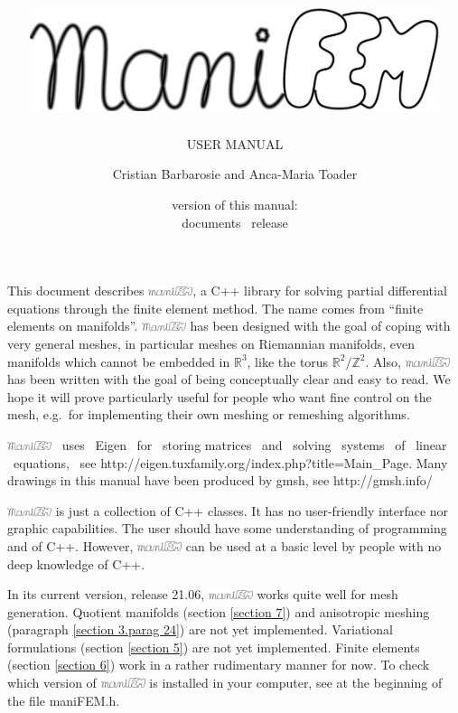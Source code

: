 \documentclass[a4paper]{scrreprt}
\title{\includegraphics[width=12cm]{manifem-grey-capital.eps}}
\subtitle{USER MANUAL}
\author{Cristian Barbarosie and Anca-Maria Toader}
\date{\small version of this manual: \manualversion\\ documents \maniFEM\ release \manifemrelease}
\def\manifemrelease{21.06}
\def\numb{}
\newcommand\ManiFEM{\leavevmode\hbox{\includegraphics[width=13mm]{manifem-large}}}
\newcommand\maniFEM{\leavevmode\hbox{\includegraphics[width=13mm]{manifem-small}}}
\renewcommand\tt{\normalfont\ttfamily}
\begin{document}
\begin{titlepage}
\maketitle
\end{titlepage}


\chapter*{}

This document describes \maniFEM, a {\tt C++} library for solving partial differential equations
through the finite element method.
The name comes from ``finite elements on manifolds''. 
{\ManiFEM} has been designed with the goal of coping with very general meshes,
in particular meshes on Riemannian manifolds, even manifolds which cannot be embedded
in $ {\mathbb R}^3 $, like the torus $ {\mathbb R}^2/{\mathbb Z}^2 $.
Also, {\maniFEM} has been written with the goal of being conceptually clear
and easy to read.
We hope it will prove particularly useful for people who want fine control on the mesh,
e.g.\ for implementing their own meshing or remeshing algorithms.

{\ManiFEM} \ uses \ {\tt Eigen} \ for \ storing matrices \ and \ solving \ systems \ of
\ linear \ equations, \ see {\small\tt http://eigen.tuxfamily.org/index.php?title=Main\_Page}.
Many drawings in this manual have been produced by {\tt gmsh}, see
{\small\tt http://gmsh.info/}

{\ManiFEM} is just a collection of {\tt C++} classes.
It has no user-friendly interface nor graphic capabilities.
The user should have some understanding of programming and of {\tt C++}.
However, {\maniFEM} can be used at a basic level by people with no deep knowledge of
{\tt C++}.

In its current version, release \manifemrelease, {\maniFEM} works quite well for mesh generation.
Quotient manifolds (section \ref{\numb section 7}) and anisotropic meshing (paragraph
\ref{\numb section 3.\numb parag 24}) are not yet implemented.
Variational formulations (section \ref{\numb section 5}) are not yet implemented.
Finite elements (section \ref{\numb section 6}) work in a rather rudimentary manner for now.
To check which version of {\maniFEM} is installed in your computer,
see at the beginning of the file {\small\tt maniFEM.h}.
\end{document}
